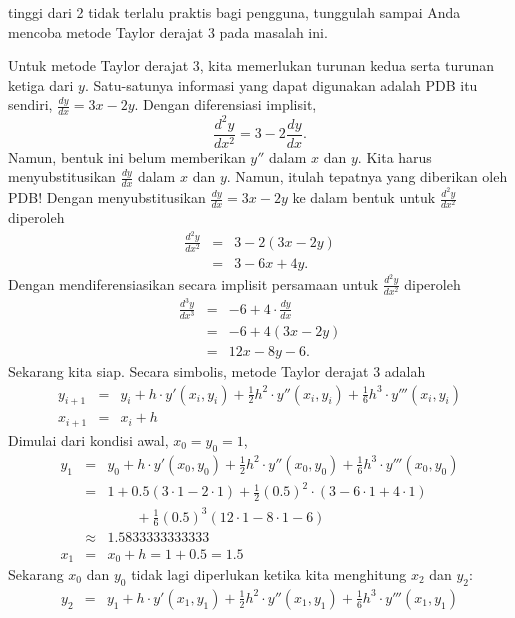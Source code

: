 \begin{description}
tinggi dari 2 tidak terlalu praktis bagi pengguna, tunggulah sampai
Anda mencoba metode Taylor derajat 3 pada masalah ini.
\item [{\ref{exc:ode-taylor-10}a:}] Untuk metode Taylor derajat 3, kita
memerlukan turunan kedua serta turunan ketiga dari $y$. Satu-satunya
informasi yang dapat digunakan adalah PDB itu sendiri, $\frac{dy}{dx}=3x-2y$.
Dengan diferensiasi implisit,
\[
\frac{d^{2}y}{dx^{2}}=3-2\frac{dy}{dx}.
\]
Namun, bentuk ini belum memberikan $y''$ dalam $x$ dan $y$. Kita
harus menyubstitusikan $\frac{dy}{dx}$ dalam $x$ dan $y$. Namun,
itulah tepatnya yang diberikan oleh PDB! Dengan menyubstitusikan $\frac{dy}{dx}=3x-2y$
ke dalam bentuk untuk $\frac{d^{2}y}{dx^{2}}$ diperoleh
\begin{eqnarray*}
\frac{d^{2}y}{dx^{2}} & = & 3-2(3x-2y)\\
 & = & 3-6x+4y.
\end{eqnarray*}
Dengan mendiferensiasikan secara implisit persamaan untuk $\frac{d^{2}y}{dx^{2}}$
diperoleh
\begin{eqnarray*}
\frac{d^{3}y}{dx^{3}} & = & -6+4\cdot\frac{dy}{dx}\\
 & = & -6+4(3x-2y)\\
 & = & 12x-8y-6.
\end{eqnarray*}
Sekarang kita siap. Secara simbolis, metode Taylor derajat 3 adalah
\begin{eqnarray*}
y_{i+1} & = & y_{i}+h\cdot y'(x_{i},y_{i})+\frac{1}{2}h^{2}\cdot y''(x_{i},y_{i})+\frac{1}{6}h^{3}\cdot y'''(x_{i},y_{i})\\
x_{i+1} & = & x_{i}+h
\end{eqnarray*}
Dimulai dari kondisi awal, $x_{0}=y_{0}=1$,
\begin{eqnarray*}
y_{1} & = & y_{0}+h\cdot y'(x_{0},y_{0})+\frac{1}{2}h^{2}\cdot y''(x_{0},y_{0})+\frac{1}{6}h^{3}\cdot y'''(x_{0},y_{0})\\
 & = & 1+0.5(3\cdot1-2\cdot1)+\frac{1}{2}(0.5)^{2}\cdot(3-6\cdot1+4\cdot1)\\
 &  & \qquad+\frac{1}{6}(0.5)^{3}(12\cdot1-8\cdot1-6)\\
 & \approx & 1.5833333333333\\
x_{1} & = & x_{0}+h=1+0.5=1.5
\end{eqnarray*}
Sekarang $x_{0}$ dan $y_{0}$ tidak lagi diperlukan ketika kita menghitung
$x_{2}$ dan $y_{2}$:
\begin{eqnarray*}
y_{2} & = & y_{1}+h\cdot y'(x_{1},y_{1})+\frac{1}{2}h^{2}\cdot y''(x_{1},y_{1})+\frac{1}{6}h^{3}\cdot y'''(x_{1},y_{1})\\

\end{eqnarray*}
\end{description}
